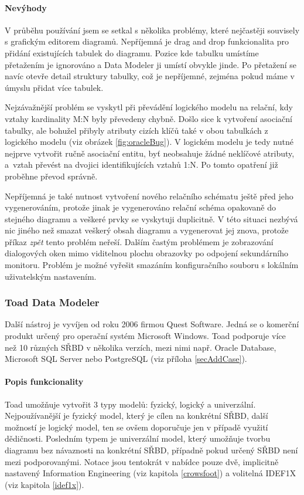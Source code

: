 \documentclass[czech,bachelor,public,dept460,male,oneside]{diploma}
\begin{document}
		\paragraph{Nevýhody}
		V průběhu používání jsem se setkal s několika problémy, které nejčastěji souvisely s grafickým editorem diagramů. Nepříjemná je drag and drop funkcionalita pro přidání existujících tabulek do diagramu. Pozice kde tabulku umístíme přetažením je ignorováno a Data Modeler ji umístí obvykle jinde. Po přetažení se navíc otevře detail struktury tabulky, což je nepříjemné, zejména pokud máme v úmyslu přidat více tabulek. 
		
		Nejzávažnější problém se vyskytl při převádění logického modelu na relační, kdy vztahy kardinality M:N byly převedeny chybně. Došlo sice k vytvoření asociační tabulky, ale bohužel přibyly atributy cizích klíčů také v obou tabulkách z logického modelu (viz obrázek \ref{fig:oracleBug}). 
		V logickém modelu je tedy nutné nejprve vytvořit ručně asociační entitu, byť neobsahuje žádné neklíčové atributy, a~vztah převést na dvojici identifikujících vztahů 1:N. Po tomto opatření již proběhne převod správně. 
		
		Nepříjemná je také nutnost vytvoření nového relačního schématu ještě před jeho vygenerováním, protože jinak je vygenerováno relační schéma opakovaně do stejného diagramu a veškeré prvky se vyskytuji duplicitně. V této situaci nezbývá nic jiného než smazat veškerý obsah diagramu a vygenerovat jej znova, protože příkaz \textit{zpět} tento problém neřeší. Dalším častým problémem je zobrazování dialogových oken mimo viditelnou plochu obrazovky po odpojení sekundárního monitoru. Problém je možné vyřešit smazáním konfiguračního souboru s lokálním uživatelským nastavením.
		
		\subsubsection{Toad Data Modeler}
		Další nástroj je vyvíjen od roku 2006 firmou Quest Software. Jedná se o komerční produkt určený pro operační systém Microsoft Windows. Toad podporuje více než 10 různých SŘBD v několika verzích, mezi nimi např. Oracle Database, Microsoft SQL Server nebo PostgreSQL (viz příloha \ref{secAddCase}).
		
		\paragraph{Popis funkcionality}
		Toad umožňuje vytvořit 3 typy modelů: fyzický, logický a univerzální. Nejpoužívanější je fyzický model, který je cílen na konkrétní SŘBD, další možností je logický model, ten se ovšem doporučuje jen v případě využití dědičnosti. Posledním typem je univerzální model, který umožňuje tvorbu diagramu bez návaznosti na konkrétní SŘBD, případně pokud určený SŘBD není mezi podporovanými. Notace jsou tentokrát v nabídce pouze dvě, implicitně nastavený Information Engineering (viz kapitola \ref{crowsfoot}) a volitelná IDEF1X (viz kapitola \ref{idef1x}).
		
\end{document}
